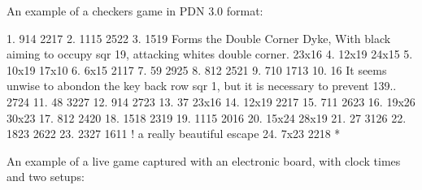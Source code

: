 \documentclass[letterpaper,10pt,english]{sphinxmanual}
\begin{document}
\sphinxAtStartPar
An example of a checkers game in PDN 3.0 format:

\begin{sphinxVerbatim}

1.  9\PYGZhy{}14 22\PYGZhy{}17 2. 11\PYGZhy{}15 25\PYGZhy{}22 3. 15\PYGZhy{}19 \PYGZob{}Forms the Double Corner Dyke, With
 black aiming to occupy sqr 19, attacking white\PYGZsq{}s double corner.\PYGZcb{} 23x16
4. 12x19 24x15 5. 10x19 17x10 6.  6x15 21\PYGZhy{}17 7.  5\PYGZhy{}9 29\PYGZhy{}25 8.  8\PYGZhy{}12 25\PYGZhy{}21
9.  7\PYGZhy{}10 17\PYGZhy{}13 10.  1\PYGZhy{}6 \PYGZob{}It seems unwise to abondon the key back row sqr 1,
 but it is necessary to prevent 13\PYGZhy{}9..\PYGZcb{} 27\PYGZhy{}24 11.  4\PYGZhy{}8 32\PYGZhy{}27 12.  9\PYGZhy{}14
27\PYGZhy{}23 13.  3\PYGZhy{}7 23x16 14. 12x19 22\PYGZhy{}17 15.  7\PYGZhy{}11 26\PYGZhy{}23 16. 19x26 30x23
17.  8\PYGZhy{}12 24\PYGZhy{}20 18. 15\PYGZhy{}18 23\PYGZhy{}19 19. 11\PYGZhy{}15 20\PYGZhy{}16 20. 15x24 28x19 21.  2\PYGZhy{}7
31\PYGZhy{}26 22. 18\PYGZhy{}23 26\PYGZhy{}22 23. 23\PYGZhy{}27 16\PYGZhy{}11 \PYGZob{}! a really beautiful escape\PYGZcb{}
24.  7x23 22\PYGZhy{}18 *
\end{sphinxVerbatim}

\sphinxAtStartPar
An example of a live game captured with an electronic board, with clock times and two setups:
\end{document}
